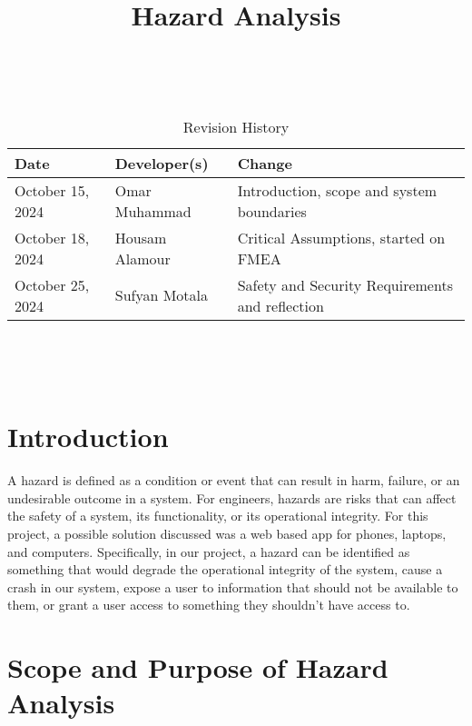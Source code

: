 \documentclass{article}
\title{Hazard Analysis\\\progname}
\author{\authname}
\date{}
\begin{document}
\maketitle
\thispagestyle{empty}

~\newpage


\begin{table}[hp]
\caption{Revision History} \label{TblRevisionHistory}
\begin{tabularx}{\textwidth}{llX}
\toprule
\textbf{Date} & \textbf{Developer(s)} & \textbf{Change}\\
\midrule
October 15, 2024 & Omar Muhammad & Introduction, scope and system boundaries\\
October 18, 2024 & Housam Alamour & Critical Assumptions, started on FMEA\\
October 25, 2024 & Sufyan Motala & Safety and Security Requirements and reflection\\
\bottomrule
\end{tabularx}
\end{table}

~\newpage

\tableofcontents

~\newpage



\section{Introduction}

A hazard is defined as a condition or event that can result in harm, failure, or an undesirable outcome in a system. For engineers, hazards are risks that can affect the safety of a system, its functionality, or its operational integrity. For this project, a possible solution discussed was a web based app for phones, laptops, and computers. Specifically, in our project, a hazard can be identified as something that would degrade the operational integrity of the system, cause a crash in our system, expose a user to information that should not be available to them, or grant a user access to something they shouldn't have access to.

\section{Scope and Purpose of Hazard Analysis}
\end{document}
